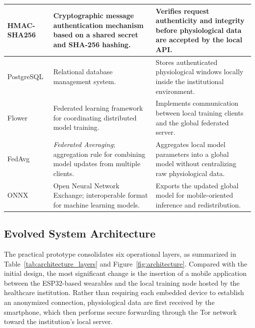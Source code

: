 \documentclass[12pt]{article}
\begin{document}
\begin{longtable}{p{2.5cm} p{4.7cm} p{6.4cm}}
HMAC-SHA256 & Cryptographic message authentication mechanism based on a shared secret and SHA-256 hashing. & Verifies request authenticity and integrity before physiological data are accepted by the local API. \\ \midrule

PostgreSQL & Relational database management system. & Stores authenticated physiological windows locally inside the institutional environment. \\ \midrule

Flower & Federated learning framework for coordinating distributed model training. & Implements communication between local training clients and the global federated server. \\ \midrule

FedAvg & \textit{Federated Averaging}; aggregation rule for combining model updates from multiple clients. & Aggregates local model parameters into a global model without centralizing raw physiological data. \\ \midrule

ONNX & Open Neural Network Exchange; interoperable format for machine learning models. & Exports the updated global model for mobile-oriented inference and redistribution. \\

\end{longtable}

\endgroup

\subsection{Evolved System Architecture}

The practical prototype consolidates six operational layers, as summarized in Table~\ref{tab:architecture_layers} and Figure~\ref{fig:architecture}. Compared with the initial design, the most significant change is the insertion of a mobile application between the ESP32-based wearables and the local training node hosted by the healthcare institution. Rather than requiring each embedded device to establish an anonymized connection, physiological data are first received by the smartphone, which then performs secure forwarding through the Tor network toward the institution's local server.
\end{document}
